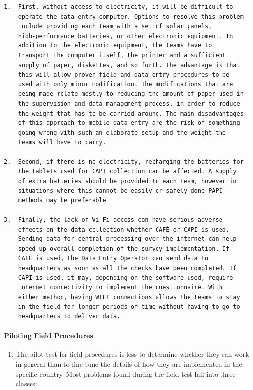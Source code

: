 \documentclass[
]{article}
\providecommand{\tightlist}{%
  \setlength{\itemsep}{0pt}\setlength{\parskip}{0pt}}
\begin{document}
\begin{verbatim}
1.  First, without access to electricity, it will be difficult to
    operate the data entry computer. Options to resolve this problem
    include providing each team with a set of solar panels,
    high-performance batteries, or other electronic equipment. In
    addition to the electronic equipment, the teams have to
    transport the computer itself, the printer and a sufficient
    supply of paper, diskettes, and so forth. The advantage is that
    this will allow proven field and data entry procedures to be
    used with only minor modification. The modifications that are
    being made relate mostly to reducing the amount of paper used in
    the supervision and data management process, in order to reduce
    the weight that has to be carried around. The main disadvantages
    of this approach to mobile data entry are the risk of something
    going wrong with such an elaborate setup and the weight the
    teams will have to carry.

2.  Second, if there is no electricity, recharging the batteries for
    the tablets used for CAPI collection can be affected. A supply
    of extra batteries should be provided to each team, however in
    situations where this cannot be easily or safely done PAPI
    methods may be preferable

3.  Finally, the lack of Wi-Fi access can have serious adverse
    effects on the data collection whether CAFÉ or CAPI is used.
    Sending data for central processing over the internet can help
    speed up overall completion of the survey implementation. If
    CAFÉ is used, the Data Entry Operator can send data to
    headquarters as soon as all the checks have been completed. If
    CAPI is used, it may, depending on the software used, require
    internet connectivity to implement the questionnaire. With
    either method, having WIFI connections allows the teams to stay
    in the field for longer periods of time without having to go to
    headquarters to deliver data.
\end{verbatim}

\hypertarget{piloting-field-procedures}{%
\paragraph{Piloting Field Procedures}\label{piloting-field-procedures}}

\begin{enumerate}
\def\labelenumi{\arabic{enumi}.}
\setcounter{enumi}{331}
\tightlist
\item
  The pilot test for field procedures is less to determine whether
  they can work in general than to fine tune the details of how they
  are implemented in the specific country. Most problems found during
  the field test fall into three classes:
\end{enumerate}
\end{document}
